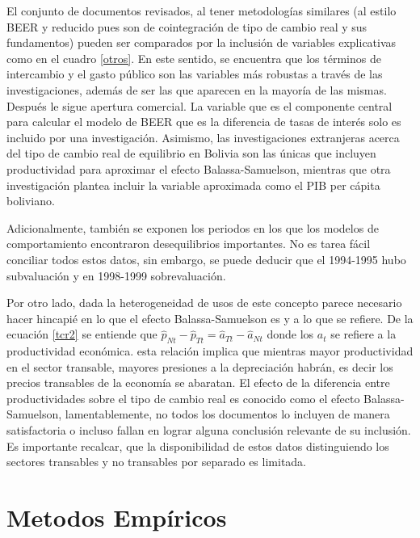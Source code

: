 \documentclass[12pt,letterpaper]{article}
\begin{document}
El conjunto de documentos revisados, al tener metodologías similares (al estilo BEER y reducido pues son de cointegración de tipo de cambio real y sus fundamentos) pueden ser comparados por la inclusión de variables explicativas como en el cuadro \ref{otros}. En este sentido, se encuentra que los términos de intercambio y el gasto público son las variables más robustas a través de las investigaciones, además de ser las que aparecen en la mayoría de las mismas. Después le sigue apertura comercial. La variable que es el componente central para calcular el modelo de BEER que es la diferencia de tasas de interés solo es incluido por una investigación. Asimismo, las investigaciones extranjeras acerca del tipo de cambio real de equilibrio en Bolivia son las únicas que incluyen productividad para aproximar el efecto Balassa-Samuelson, mientras que otra investigación plantea incluir la variable aproximada como el PIB per cápita boliviano.

Adicionalmente, también se exponen los periodos en los que los modelos de comportamiento encontraron desequilibrios importantes. No es tarea fácil conciliar todos estos datos, sin embargo, se puede deducir que el 1994-1995 hubo subvaluación y en 1998-1999 sobrevaluación. 

Por otro lado, dada la heterogeneidad de usos de este concepto parece necesario hacer hincapié en lo que el efecto Balassa-Samuelson es y a lo que se refiere. De la ecuación \ref{tcr2} se entiende que $\hat{p}_{Nt}-\hat{p}_{Tt}=\hat{a}_{Tt}-\hat{a}_{Nt}$ donde los $a_t$ se refiere a la productividad económica. esta relación implica que mientras mayor productividad en el sector transable, mayores presiones a la depreciación habrán, es decir los precios transables de la economía se abaratan. El efecto de la diferencia entre productividades sobre el tipo de cambio real es conocido como el efecto Balassa-Samuelson, lamentablemente, no todos los documentos lo incluyen de manera satisfactoria o incluso fallan en lograr alguna conclusión relevante de su inclusión. Es importante recalcar, que la disponibilidad de estos datos distinguiendo los sectores transables y no transables por separado es limitada. 


\section{Metodos Empíricos}\label{tcr}
\end{document}
